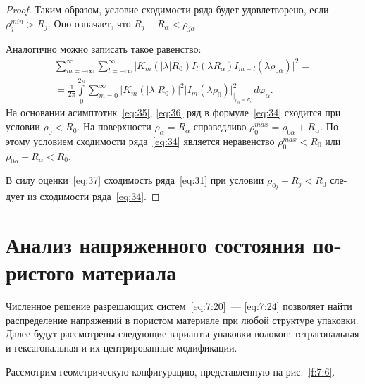 \begin{russian}
\begin{proof}
Таким образом, условие сходимости ряда будет удовлетворено, если $\rho_j^{min}>R_j$. Оно означает, что $R_j+R_\alpha<\rho_{j\alpha}$.{\sloppy\par}

Аналогично можно записать такое равенство:
\begin{multline}
\sum\limits_{m=-\infty}^\infty\sum\limits_{l=-\infty}^\infty\bigg|K_m(|\lambda| R_0)I_l(\lambda R_\alpha)I_{m-l}(\lambda\rho_{0\alpha})\bigg|^2=\\
=\frac{1}{2\pi}\int\limits_0^{2\pi}\sum\limits_{m=0}^\infty\bigg|K_m(|\lambda|R_0)\bigg|^2\bigg|I_m(\lambda\rho_0)\bigg|_{|_{\rho_\alpha=R_\alpha}}^2d\varphi_\alpha.
\label{eq:34}
\end{multline}
На основании асимптотик~\eqref{eq:35}, \eqref{eq:36} ряд в формуле~\eqref{eq:34} сходится при условии $\rho_0<R_0$. На поверхности $\rho_\alpha=R_\alpha$ справедливо $\rho_0^{max}=\rho_{0\alpha}+R_\alpha$. Поэтому условием сходимости ряда~\eqref{eq:34} является неравенство $\rho_0^{max}<R_0$ или $\rho_{0\alpha}+R_\alpha<R_0$.

В силу оценки~\eqref{eq:37} сходимость ряда~\eqref{eq:31} при условии $\rho_{0j}+R_j<R_0$ следует из сходимости ряда~\eqref{eq:34}.
\end{proof}


\section{Анализ напряженного состояния пористого материала}

Численное решение разрешающих систем~\eqref{eq:7:20}~--- \eqref{eq:7:24} позволяет найти распределение напряжений в пористом материале при любой структуре упаковки. Далее будут рассмотрены следующие варианты упаковки волокон: тетрагональная и гексагональная и их центрированные модификации.

Рассмотрим геометрическую конфигурацию, представленную на рис.~\ref{f:7:6}.


\end{russian}
